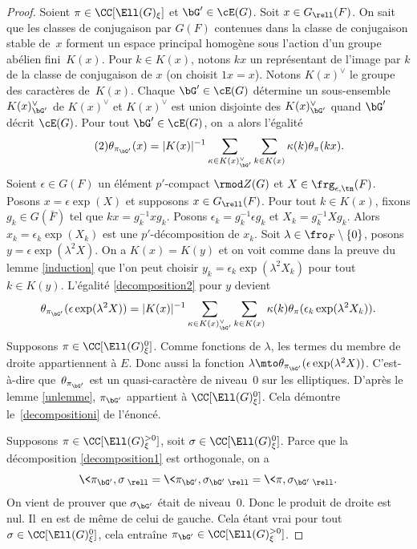 \begin{proof}
Soient $\pi\in \CC[\Ell(G)_{\xi}]$ et $\bG'\in \cE(G)$. Soit $x\in G_{\rell}(F)$. On sait que les classes de conjugaison par $G(F)$ contenues dans la classe de conjugaison stable de~$x$ forment un espace principal homogène sous l'action d'un groupe abélien fini~$K(x)$. Pour $k\in K(x)$, notons $kx$ un représentant de l'image par $k$ de la classe de conjugaison de $x$ (on choisit $1x=x$). Notons $K(x)^{\vee}$ le groupe des caractères de~$K(x)$. Chaque $\bG'\in \cE(G)$ détermine un sous-ensemble $K(x)^{\vee}_{\bG'}$ de $K(x)^{\vee}$ et $K(x)^{\vee}$ est union disjointe des $K(x)^{\vee}_{\bG'}$ quand $\bG'$ décrit $\cE(G)$. Pour tout $\bG'\in \cE(G)$, on~a alors l'égalité
\begin{equation}\tag{2}\label{decomposition2}
\theta_{\pi_{\bG'}}(x)=\vert K(x)\vert ^{-1}\sum_{\kappa\in K(x)^{\vee}_{\bG'}}\sum_{k\in K(x)}\kappa(k)\theta_{\pi}(kx).
\end{equation}
Soient $\epsilon\in G(F)$ un élément $p'$-compact $\rmod Z(G)$ et $X\in \frg_{\epsilon,\tn}(F)$. Posons $x=\epsilon \exp(X)$ et supposons $x\in G_{\rell}(F)$. Pour tout $k\in K(x)$, fixons $g_{k}\in G(\bar{F})$ tel que $kx=g_{k}^{-1}xg_{k}$. Posons $\epsilon_{k}=g_{k}^{-1}\epsilon g_{k}$ et $X_{k}=g_{k}^{-1} X g_{k}$. Alors $x_{k}=\epsilon_{k}\exp(X_{k})$ est une $p'$-décomposition de $x_{k}$. Soit $\lambda\in \fro_{F}\setminus\{0\}$, posons $y=\epsilon \exp(\lambda^2 X)$. On a $K(x)=K(y)$ et on voit comme dans la preuve du lemme \ref{induction} que l'on peut choisir $y_{k}=\epsilon_{k}\exp(\lambda^2 X_{k})$ pour tout $k\in K(y)$. L'égalité \eqref{decomposition2} pour $y$ devient
\[
\theta_{\pi_{\bG'}}(\epsilon \exp(\lambda^2 X))=\vert K(x)\vert ^{-1}\sum_{\kappa\in K(x)^{\vee}_{\bG'}}\sum_{k\in K(x)}\kappa(k)\theta_{\pi}(\epsilon_{k}\exp(\lambda^2 X_{k})).
\]
Supposons $\pi\in \CC[\Ell(G)^0_{\xi}]$. Comme fonctions de $\lambda$, les termes du membre de droite appartiennent à $E$. Donc aussi la fonction $\lambda\mto \theta_{\pi_{\bG'}}(\epsilon \exp(\lambda^2 X))$. C'est-à-dire que~$\theta_{\pi_{\bG'}}$ est un quasi-caractère de niveau~$0$ sur les elliptiques. D'après le lemme \ref{unlemme}, $\pi_{\bG'}$ appartient à $\CC[\Ell(G)_{\xi}^0]$. Cela démontre le~\eqref{decompositioni} de l'énoncé.

Supposons $\pi\in \CC[\Ell(G)^{>0}_{\xi}]$, soit $\sigma\in \CC[\Ell(G)^0_{\xi}]$. Parce que la décomposition \eqref{decomposition1} est orthogonale, on a
\[
\<\pi_{\bG'},\sigma\>_{\rell}=\<\pi_{\bG'},\sigma_{\bG'}\>_{\rell}=\<\pi,\sigma_{\bG'}\>_{\rell}.
\]
On vient de prouver que $\sigma_{\bG'}$ était de niveau~$0$. Donc le produit de droite est nul. Il~en est de même de celui de gauche. Cela étant vrai pour tout $\sigma\in \CC[\Ell(G)^0_{\xi}]$, cela entraîne $\pi_{\bG'}\in \CC[\Ell(G)^{>0}_{\xi}]$.
\end{proof}

